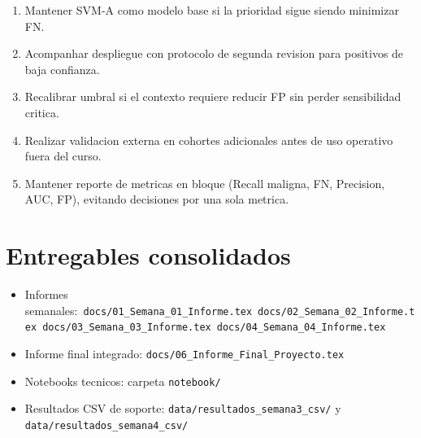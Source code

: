 \documentclass[11pt,a4paper]{article}
\begin{document}
\begin{enumerate}[leftmargin=1.2cm]
\item Mantener SVM-A como modelo base si la prioridad sigue siendo minimizar FN.
\item Acompanhar despliegue con protocolo de segunda revision para positivos de baja confianza.
\item Recalibrar umbral si el contexto requiere reducir FP sin perder sensibilidad critica.
\item Realizar validacion externa en cohortes adicionales antes de uso operativo fuera del curso.
\item Mantener reporte de metricas en bloque (Recall maligna, FN, Precision, AUC, FP), evitando decisiones por una sola metrica.
\end{enumerate}

\section{Entregables consolidados}

\begin{itemize}[leftmargin=1.2cm]
\item Informes semanales:\
\texttt{docs/01\_Semana\_01\_Informe.tex}\
\texttt{docs/02\_Semana\_02\_Informe.tex}\
\texttt{docs/03\_Semana\_03\_Informe.tex}\
\texttt{docs/04\_Semana\_04\_Informe.tex}
\item Informe final integrado: \texttt{docs/06\_Informe\_Final\_Proyecto.tex}
\item Notebooks tecnicos: carpeta \texttt{notebook/}
\item Resultados CSV de soporte: \texttt{data/resultados\_semana3\_csv/} y \texttt{data/resultados\_semana4\_csv/}
\end{itemize}
\end{document}
